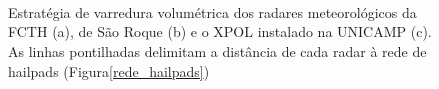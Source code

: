 \begin{figure}[hp]
	\begin{center}
		\caption{Estratégia de varredura volumétrica dos radares meteorológicos da FCTH (a), de São Roque (b) e o XPOL instalado na UNICAMP (c). As linhas pontilhadas delimitam a distância de cada radar à rede de hailpads (Figura\autoref{rede_hailpads})} 
		\label{estrategia_radares}
		\\
		\\
		\\
	\end{center}
\end{figure}

